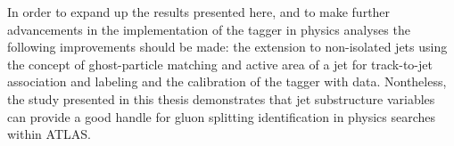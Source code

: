 In order to expand up the results presented here, and to make further advancements in the implementation of the tagger in physics analyses the following improvements should be made: the extension to non-isolated jets using the concept of ghost-particle matching and active area of a jet for track-to-jet association and labeling and the calibration of the tagger with data. %
Nontheless, the study presented in this thesis demonstrates that jet substructure variables can provide a good handle for gluon splitting identification in physics searches within ATLAS.






